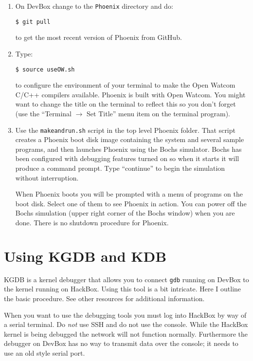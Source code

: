 \documentclass[twocolumn]{article}
\begin{document}
\begin{enumerate}

\item On DevBox change to the \texttt{Phoenix} directory and do:
\begin{Verbatim}
$ git pull
\end{Verbatim}
  to get the most recent version of Phoenix from GitHub.

\item Type:
\begin{Verbatim}
$ source useOW.sh
\end{Verbatim}
  to configure the environment of your terminal to make the Open Watcom C/C++ compilers
  available. Phoenix is built with Open Watcom. You might want to change the title on the
  terminal to reflect this so you don't forget (use the ``Terminal $\rightarrow$ Set Title''
  menu item on the terminal program).

\item Use the \texttt{makeandrun.sh} script in the top level Phoenix folder. That script creates
  a Phoenix boot disk image containing the system and several sample programs, and then launches
  Phoenix using the Bochs simulator. Bochs has been configured with debugging features turned on
  so when it starts it will produce a command prompt. Type ``continue'' to begin the simulation
  without interruption.

  When Phoenix boots you will be prompted with a menu of programs on the boot disk. Select one
  of them to see Phoenix in action. You can power off the Bochs simulation (upper right corner
  of the Bochs window) when you are done. There is no shutdown procedure for Phoenix.

\end{enumerate}

\section{Using KGDB and KDB}

KGDB is a kernel debugger that allows you to connect \texttt{gdb} running on DevBox to the
kernel running on HackBox. Using this tool is a bit intricate. Here I outline the basic
procedure. See other resources for additional information.

When you want to use the debugging tools you must log into HackBox by way of a serial terminal.
Do \emph{not} use SSH and do not use the console. While the HackBox kernel is being debugged the
network will not function normally. Furthermore the debugger on DevBox has no way to transmit
data over the console; it needs to use an old style serial port.
\end{document}
